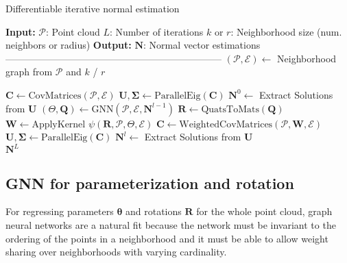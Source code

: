 \documentclass[10pt,twocolumn,letterpaper]{article}
\begin{document}
\begin{algorithm}[t]
\caption{Differentiable iterative normal estimation}
    \label{alg:main}

\begin{algorithmic}
\State \textbf{Input:} 
\State $\mathcal{P}$: Point cloud
\State $L$: Number of iterations 
\State $k$ or $r$: Neighborhood size (num. neighbors or radius)
\State \textbf{Output:} 
\State $\mathbf{N} $: Normal vector estimations
\State --------------------------------------------------------------------
\State $(\mathcal{P},\mathcal{E}) \leftarrow$ Neighborhood graph from $\mathcal{P}$ and $k$ / $r$

 \State  $\mathbf{C} \leftarrow \textrm{CovMatrices}(\mathcal{P}, \mathcal{E})$
 \State  $\mathbf{U}, \mathbf{\Sigma} \leftarrow \textrm{ParallelEig}(\mathbf{C}) $
 \State  $\mathbf{N}^0 \leftarrow$ Extract Solutions from $\mathbf{U}$
  \State $(\Theta, \mathbf{Q}) \leftarrow \textrm{GNN}(\mathcal{P}, \mathcal{E}, \mathbf{N}^{l-1})$ 
  \State $\mathbf{R} \leftarrow \textrm{QuatsToMats}(\mathbf{Q})$
  \State $\mathbf{W} \leftarrow \textrm{ApplyKernel } \psi(\mathbf{R}, \mathcal{P}, \Theta, \mathcal{E})$
  \State  $\mathbf{C} \leftarrow \textrm{WeightedCovMatrices}(\mathcal{P}, \mathbf{W}, \mathcal{E})$
  \State  $\mathbf{U}, \mathbf{\Sigma} \leftarrow \textrm{ParallelEig}(\mathbf{C}) $
  \State  $\mathbf{N}^l \leftarrow$ Extract Solutions from $\mathbf{U}$
\EndFor\\
\Return $\mathbf{N}^L$
\end{algorithmic}
\end{algorithm}


\subsection{GNN for parameterization and rotation}\label{sec:deepw}
For regressing parameters $\mathbf{\theta}$ and rotations $\mathbf{R}$ for the whole point cloud, graph neural networks \cite{Fey:2019, Hamilton:2017} are a natural fit because the network must be invariant to the ordering of the points in a neighborhood and it must be able to allow weight sharing over neighborhoods with varying cardinality.
\end{document}
